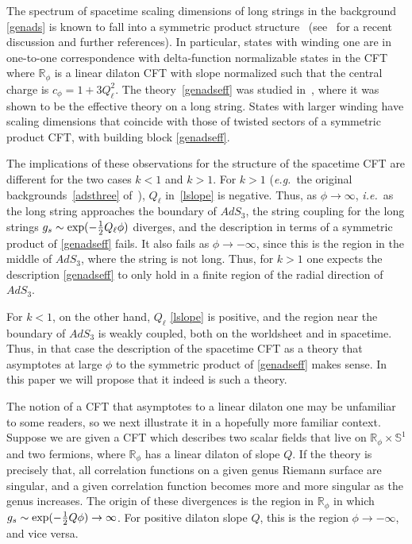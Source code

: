 \documentclass[12pt]{article}
\def\ie{{i.e.}}
\def\eg{{e.g.}}
\def\half{\frac12}
\newcommand{\bR}{{\mathbb R}}
\newcommand{\bS}{{\mathbb S}}
\numberwithin{equation}{section}
\def\cM{\mathcal {M}} \def\cN{\mathcal {N}} \def\cO{\mathcal {O}}
\def\ie{{\it i.e.}}
\def\eg{{\it e.g.}}
\def\half{\frac12}
\def\exp{{\rm exp}}
\def\ie{{\it i.e.}}
\def\eg{{\it e.g.}}
\begin{document}
The spectrum of spacetime scaling dimensions of long strings in the background \eqref{genads} is known to fall into a symmetric product structure~ (see~ for a recent discussion and further references).  In particular, states with winding one are in one-to-one correspondence with delta-function normalizable states in the CFT  
\eqn[genadseff]{\bR_\phi\times \bS^1\times \cM~,}
where $\bR_\phi$ is a linear dilaton CFT with slope 
normalized such that the central charge is $c_\phi=1+3Q_\ell^2$.
The theory~\eqref{genadseff} was studied in~, where it was shown to be the effective theory on a long string. States with larger winding have scaling dimensions that coincide with those of twisted sectors of a symmetric product CFT, with building block \eqref{genadseff}.

The implications of these observations for the structure of the spacetime CFT are different for the two cases $k<1$ and $k>1$. For $k>1$ (\eg\ the original backgrounds~\eqref{adsthree} of~), $Q_\ell$ in~\eqref{lslope} is negative. Thus, as $\phi\to\infty$, \ie\ as the long string approaches the boundary of $AdS_3$, the string coupling for the long strings $g_s\sim \exp(-\half Q_\ell\phi)$ diverges, and the description in terms of a symmetric product of \eqref{genadseff} fails. It also fails as $\phi\to-\infty$, since this is the region in the middle of $AdS_3$, where the string is not long. Thus, for $k>1$ one expects the description \eqref{genadseff} to only hold in a finite region of the radial direction of $AdS_3$.

For $k<1$, on the other hand, $Q_\ell$ \eqref{lslope} is positive, and the region near the boundary of $AdS_3$ is weakly coupled, both on the worldsheet and in spacetime. Thus, in that case the description of the spacetime CFT as a theory that asymptotes at large $\phi$ to the symmetric product of \eqref{genadseff} makes sense. In this paper we will propose that it indeed is such a theory. 

The notion of a CFT that asymptotes to a linear dilaton one may be unfamiliar to some readers, so we next illustrate it in a hopefully more familiar context. Suppose we are given a CFT which describes two scalar fields that live on $\bR_\phi\times \bS^1$ and two fermions, where $\bR_\phi$ has a linear dilaton of slope $Q$. If the theory is precisely that, all correlation functions on a given genus Riemann surface are singular, and a given correlation function becomes more and more singular as the genus increases.  The origin of these divergences is the region in $\bR_\phi$ in which $g_s\sim \exp(-\half Q\phi)\to\infty$. For positive dilaton slope $Q$, this is the region $\phi\to-\infty$, and vice versa. 
\end{document}
